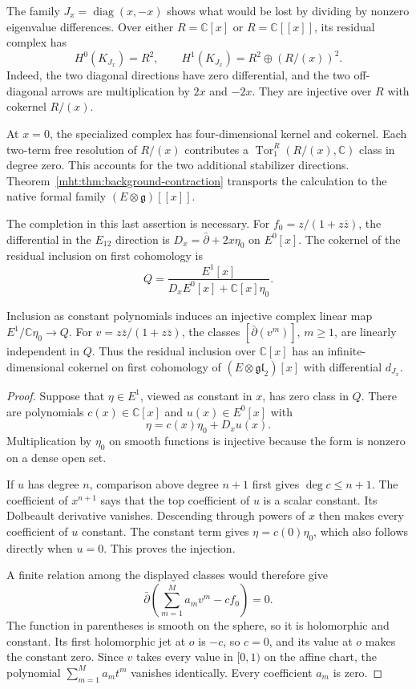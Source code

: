 The family $J_x=\operatorname{diag}(x,-x)$ shows what would be lost by
dividing by nonzero eigenvalue differences. Over either
$R=\mathbb C[x]$ or $R=\mathbb C[[x]]$, its residual complex has
\begin{equation}\label{mht:eq:collision-torsion}
 H^0(K_{J_x})=R^2,\qquad
 H^1(K_{J_x})=R^2\oplus(R/(x))^2.
\end{equation}
Indeed, the two diagonal directions have zero differential, and the
two off-diagonal arrows are multiplication by $2x$ and $-2x$.
They are injective over $R$ with cokernel $R/(x)$.

At $x=0$, the specialized complex has four-dimensional kernel and
cokernel. Each two-term free resolution of $R/(x)$ contributes a
$\operatorname{Tor}_1^R(R/(x),\mathbb C)$ class in degree zero.
This accounts for the two additional stabilizer directions.
Theorem~\ref{mht:thm:background-contraction} transports the calculation
to the native formal family $(E\otimes\mathfrak g)[[x]]$.

The completion in this last assertion is necessary. For
$f_0=z/(1+z\bar z)$, the differential in the $E_{12}$ direction is
$D_x=\bar\partial+2x\eta_0$ on $E^0[x]$. The cokernel of the residual
inclusion on first cohomology is
\[
 Q=\frac{E^1[x]}{D_xE^0[x]+\mathbb C[x]\eta_0}.
\]

\begin{proposition}\label{mht:prop:polynomial-family-failure}
Inclusion as constant polynomials induces an injective complex linear
map $E^1/\mathbb C\eta_0\longrightarrow Q$.
For $v=z\bar z/(1+z\bar z)$, the classes
$[\bar\partial(v^m)]$, $m\geq1$, are linearly independent in $Q$.
Thus the residual inclusion over $\mathbb C[x]$ has an
infinite-dimensional cokernel on first cohomology of
$(E\otimes\mathfrak{gl}_2)[x]$ with differential $d_{J_x}$.
\end{proposition}

\begin{proof}
Suppose that $\eta\in E^1$, viewed as constant in $x$, has zero class in $Q$.
There are polynomials $c(x)\in\mathbb C[x]$ and $u(x)\in E^0[x]$ with
\[
 \eta=c(x)\eta_0+D_xu(x).
\]
Multiplication by $\eta_0$ on smooth functions is injective because the
form is nonzero on a dense open set.

If $u$ has degree $n$, comparison above degree $n+1$ first gives
$\deg c\leq n+1$. The coefficient of $x^{n+1}$ says that the top
coefficient of $u$ is a scalar constant. Its Dolbeault derivative
vanishes. Descending through powers of $x$ then makes every coefficient
of $u$ constant. The constant term gives $\eta=c(0)\eta_0$,
which also follows directly when $u=0$. This proves the injection.

A finite relation among the displayed classes would therefore give
\[
 \bar\partial\left(\sum_{m=1}^M a_m v^m-cf_0\right)=0.
\]
The function in parentheses is smooth on the sphere, so it is
holomorphic and constant. Its first holomorphic jet at $o$ is $-c$,
so $c=0$, and its value at $o$ makes the constant zero.
Since $v$ takes every value in $[0,1)$ on the affine chart,
the polynomial $\sum_{m=1}^M a_m t^m$ vanishes identically.
Every coefficient $a_m$ is zero.
\end{proof}

